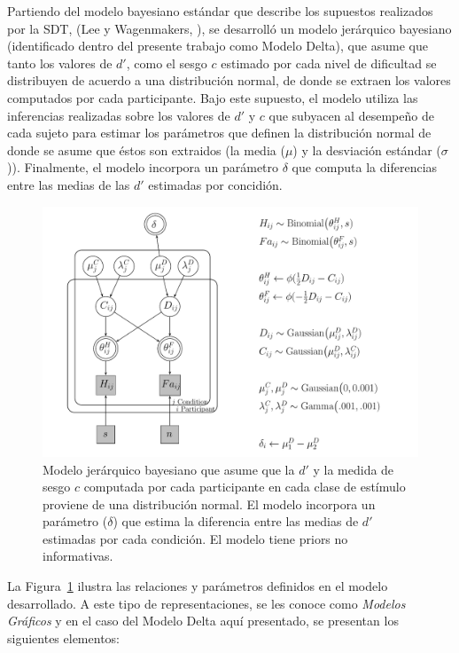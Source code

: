 Partiendo del modelo bayesiano estándar que describe los supuestos realizados por la SDT, (Lee y Wagenmakers, \citeyear{LeeBook}), se desarrolló un modelo jerárquico bayesiano (identificado dentro del presente trabajo como Modelo Delta), que asume que tanto los valores de $d'$, como el sesgo $c$ estimado por cada nivel de dificultad se distribuyen de acuerdo a una distribución normal, de donde se extraen los valores computados por cada participante. Bajo este supuesto, el modelo utiliza las inferencias realizadas sobre los valores de $d'$ y $c$ que subyacen al desempeño de cada sujeto para estimar los parámetros que definen la distribución normal de donde se asume que éstos son extraidos (la media ($\mu$) y la desviación estándar ($\sigma$)). Finalmente, el modelo incorpora un parámetro $\delta$ que computa la diferencias entre las medias de las $d'$ estimadas por concidión.\\

\begin{figure}[th]
\centering
\includegraphics[width=1.1\textwidth]{Figures/Model_Delta_Diff_D}
\caption[Modelo Delta: Modelo jerárquico bayesiano para revisar las diferencias en $d'$ entre clases de estímulos]{Modelo jerárquico bayesiano que asume que la $d'$ y la medida de sesgo $c$ computada por cada participante en cada clase de estímulo proviene de una distribución normal. El modelo incorpora un parámetro ($\delta$) que estima la diferencia entre las medias de $d'$ estimadas por cada condición. El modelo tiene priors no informativas.}
\label{fig:Mod_Delta}
\end{figure}

La Figura~\ref{fig:Mod_Delta} ilustra las relaciones y parámetros definidos en el modelo desarrollado. A este tipo de representaciones, se les conoce como \textit{Modelos Gráficos} y en el caso del Modelo Delta aquí presentado, se presentan los siguientes elementos:\\

